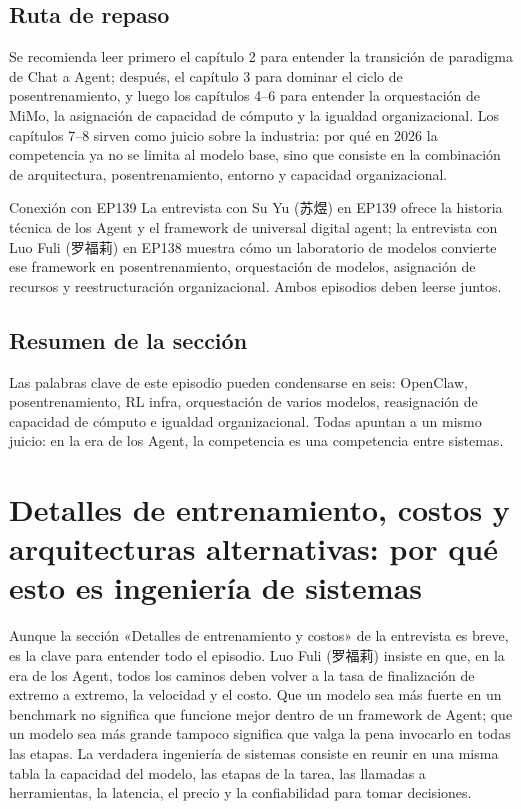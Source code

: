 \documentclass[a4paper]{article}
\begin{document}
\subsection{Ruta de repaso}

Se recomienda leer primero el capítulo 2 para entender la transición de paradigma de Chat a Agent; después, el capítulo 3 para dominar el ciclo de posentrenamiento, y luego los capítulos 4--6 para entender la orquestación de MiMo, la asignación de capacidad de cómputo y la igualdad organizacional. Los capítulos 7--8 sirven como juicio sobre la industria: por qué en 2026 la competencia ya no se limita al modelo base, sino que consiste en la combinación de arquitectura, posentrenamiento, entorno y capacidad organizacional.

\begin{knowledgebox}{Conexión con EP139}
La entrevista con Su Yu (苏煜) en EP139 ofrece la historia técnica de los Agent y el framework de universal digital agent; la entrevista con Luo Fuli (罗福莉) en EP138 muestra cómo un laboratorio de modelos convierte ese framework en posentrenamiento, orquestación de modelos, asignación de recursos y reestructuración organizacional. Ambos episodios deben leerse juntos.
\end{knowledgebox}

\subsection{Resumen de la sección}

Las palabras clave de este episodio pueden condensarse en seis: OpenClaw, posentrenamiento, RL infra, orquestación de varios modelos, reasignación de capacidad de cómputo e igualdad organizacional. Todas apuntan a un mismo juicio: en la era de los Agent, la competencia es una competencia entre sistemas.

\section{Detalles de entrenamiento, costos y arquitecturas alternativas: por qué esto es ingeniería de sistemas}

Aunque la sección «Detalles de entrenamiento y costos» de la entrevista es breve, es la clave para entender todo el episodio. Luo Fuli (罗福莉) insiste en que, en la era de los Agent, todos los caminos deben volver a la tasa de finalización de extremo a extremo, la velocidad y el costo. Que un modelo sea más fuerte en un benchmark no significa que funcione mejor dentro de un framework de Agent; que un modelo sea más grande tampoco significa que valga la pena invocarlo en todas las etapas. La verdadera ingeniería de sistemas consiste en reunir en una misma tabla la capacidad del modelo, las etapas de la tarea, las llamadas a herramientas, la latencia, el precio y la confiabilidad para tomar decisiones.
\end{document}
